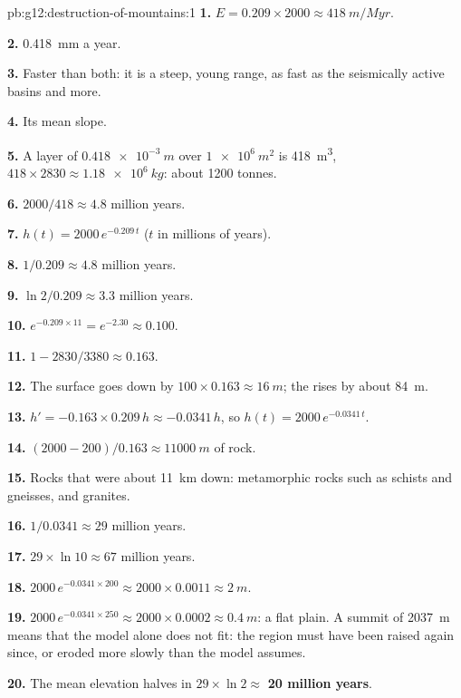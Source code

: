 \begin{solution}{pb:g12:destruction-of-mountains:1}
\textbf{1.} $E = 0.209 \times 2000 \approx \qty{418}{m/Myr}$.

\textbf{2.} \qty{0.418}{mm} a year.

\textbf{3.} Faster than both: it is a steep, young range, as fast as the
seismically active basins and more.

\textbf{4.} Its mean slope.

\textbf{5.} A layer of $\qty{0.418e-3}{m}$ over $\qty{1e6}{m^2}$ is
\qty{418}{m^3}, $418 \times 2830 \approx \qty{1.18e6}{kg}$: about 1200
tonnes.

\textbf{6.} $2000/418 \approx 4.8$ million years.

\textbf{7.} $h(t) = 2000\,e^{-0.209\,t}$ ($t$ in millions of years).

\textbf{8.} $1/0.209 \approx 4.8$ million years.

\textbf{9.} $\ln 2/0.209 \approx 3.3$ million years.

\textbf{10.} $e^{-0.209 \times 11} = e^{-2.30} \approx 0.100$.

\textbf{11.} $1 - 2830/3380 \approx 0.163$.

\textbf{12.} The surface goes down by $100 \times 0.163 \approx \qty{16}{m}$;
the  rises by about \qty{84}{m}.

\textbf{13.} $h' = -0.163 \times 0.209\,h \approx -0.0341\,h$, so $h(t) =
2000\,e^{-0.0341\,t}$.

\textbf{14.} $(2000 - 200)/0.163 \approx \qty{11000}{m}$ of rock.

\textbf{15.} Rocks that were about \qty{11}{km} down: metamorphic rocks
such as schists and gneisses, and granites.

\textbf{16.} $1/0.0341 \approx 29$ million years.

\textbf{17.} $29 \times \ln 10 \approx 67$ million years.

\textbf{18.} $2000\,e^{-0.0341 \times 200} \approx 2000 \times 0.0011 \approx
\qty{2}{m}$.

\textbf{19.} $2000\,e^{-0.0341 \times 250} \approx 2000 \times 0.0002 \approx
\qty{0.4}{m}$: a flat plain. A summit of \qty{2037}{m} means that the model
alone does not fit: the region must have been raised again since, or eroded
more slowly than the model assumes.

\textbf{20.} The mean elevation halves in $29 \times \ln 2 \approx$
\textbf{20 million years}.
\end{solution}
